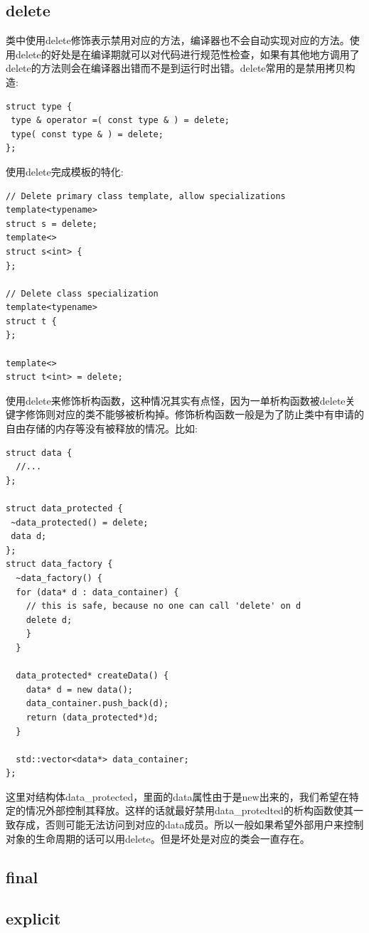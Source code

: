 \documentclass[12pt]{book}
\begin{document}
\subsection{delete}
类中使用delete修饰表示禁用对应的方法，编译器也不会自动实现对应的方法。使用delete的好处是在编译期就可以对代码进行规范性检查，如果有其他地方调用了delete的方法则会在编译器出错而不是到运行时出错。delete常用的是禁用拷贝构造:
\begin{lstlisting}
struct type {
 type & operator =( const type & ) = delete;
 type( const type & ) = delete;
};
\end{lstlisting}

使用delete完成模板的特化:
\begin{lstlisting}
// Delete primary class template, allow specializations
template<typename>
struct s = delete;
template<>
struct s<int> {
};

// Delete class specialization
template<typename>
struct t {
};

template<>
struct t<int> = delete;
\end{lstlisting}

使用delete来修饰析构函数，这种情况其实有点怪，因为一单析构函数被delete关键字修饰则对应的类不能够被析构掉。修饰析构函数一般是为了防止类中有申请的自由存储的内存等没有被释放的情况。比如:
\begin{lstlisting}
struct data {
  //...
};
	
struct data_protected {
 ~data_protected() = delete;
 data d;
};
struct data_factory {		
  ~data_factory() {
  for (data* d : data_container) {
	// this is safe, because no one can call 'delete' on d
	delete d;
	}
  }
		
  data_protected* createData() {
	data* d = new data();
	data_container.push_back(d);
	return (data_protected*)d;
  }

  std::vector<data*> data_container;
};
\end{lstlisting}

这里对结构体data\_protected，里面的data属性由于是new出来的，我们希望在特定的情况外部控制其释放。这样的话就最好禁用data\_protedted的析构函数使其一致存成，否则可能无法访问到对应的data成员。所以一般如果希望外部用户来控制对象的生命周期的话可以用delete。但是坏处是对应的类会一直存在。

\subsection{final}
\subsection{explicit}
\end{document}
